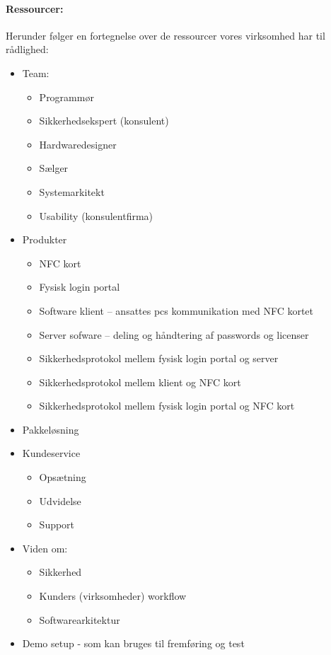 \paragraph{Ressourcer:}
Herunder følger en fortegnelse over de ressourcer vores virksomhed har til rådlighed:
\begin{itemize}
\item Team:
  \begin{itemize}
  \item Programmør
  \item Sikkerhedsekspert (konsulent)
  \item Hardwaredesigner
  \item Sælger
  \item Systemarkitekt
  \item Usability (konsulentfirma)
  \end{itemize}
\item Produkter
  \begin{itemize}
  \item NFC kort
  \item Fysisk login portal
  \item Software klient -- ansattes pcs kommunikation med NFC kortet
  \item Server sofware -- deling og håndtering af passwords og licenser
  \item Sikkerhedsprotokol mellem fysisk login portal og server
  \item Sikkerhedsprotokol mellem klient og NFC kort
  \item Sikkerhedsprotokol mellem fysisk login portal og NFC kort
  \end{itemize}
\item Pakkeløsning
\item Kundeservice
  \begin{itemize}
  \item Opsætning
  \item Udvidelse
  \item Support
  \end{itemize}
\item Viden om:
  \begin{itemize}
  \item Sikkerhed
  \item Kunders (virksomheder) workflow
  \item Softwarearkitektur
  \end{itemize}
\item Demo setup - som kan bruges til fremføring og test
\end{itemize}
